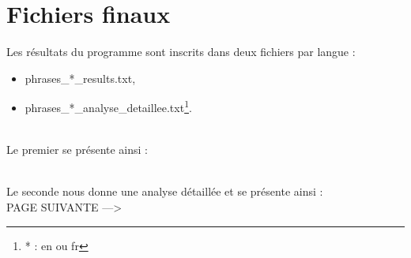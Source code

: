 \section{Fichiers finaux}

Les résultats du programme sont inscrits dans deux fichiers par langue : 
\begin{itemize}
    \item phrases\_*\_results.txt,
    \item phrases\_*\_analyse\_detaillee.txt\footnote{* : en ou fr}.
\end{itemize}

~\\ Le premier se présente ainsi : \\ 



~~\\

Le seconde nous donne une analyse détaillée et se présente ainsi : \\ 

{ \Huge{PAGE SUIVANTE ---> } }


